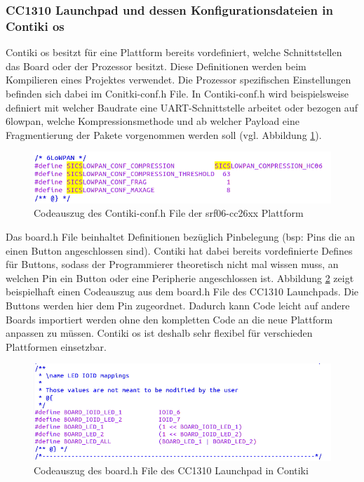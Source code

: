 	\subsubsection{CC1310 Launchpad und dessen Konfigurationsdateien in Contiki \ac{os}}
	Contiki \ac{os} besitzt für eine Plattform bereits vordefiniert, welche Schnittstellen das Board oder der Prozessor besitzt. Diese Definitionen werden beim Kompilieren eines Projektes verwendet. Die Prozessor spezifischen Einstellungen befinden sich dabei im Conitki-conf.h File. In Contiki-conf.h wird beispielsweise definiert mit welcher Baudrate eine UART-Schnittstelle arbeitet oder bezogen auf \ac{6lowpan}, welche Kompressionsmethode und ab welcher Payload eine Fragmentierung der Pakete vorgenommen werden soll (vgl. Abbildung \ref{Contiki-conf}).\\
	\begin{figure}
		\centering
		\includegraphics[scale=0.5]{Grafiken-Julian/Contiki_conf.png}
		\caption{Codeauszug des Contiki-conf.h File der srf06-cc26xx Plattform}
		\label{Contiki-conf}
	\end{figure}
	Das board.h File beinhaltet Definitionen bezüglich Pinbelegung (bsp: Pins die an einen Button angeschlossen sind). Contiki hat dabei bereits vordefinierte Defines für Buttons, sodass der Programmierer theoretisch nicht mal wissen muss, an welchen Pin ein Button oder eine Peripherie angeschlossen ist. Abbildung \ref{Boardfiles} zeigt beispielhaft einen Codeauszug aus dem board.h File des CC1310 Launchpads. Die Buttons werden hier dem Pin zugeordnet. Dadurch kann Code leicht auf andere Boards importiert werden ohne den kompletten Code an die neue Plattform anpassen zu müssen. Contiki \ac{os} ist deshalb sehr flexibel für verschieden Plattformen einsetzbar.\\
	\begin{figure}
		\centering
		\includegraphics[scale=0.5]{Grafiken-Julian/Boardfiles.png}
		\caption{Codeauszug des board.h File des CC1310 Launchpad in Contiki}
		\label{Boardfiles}
	\end{figure}
